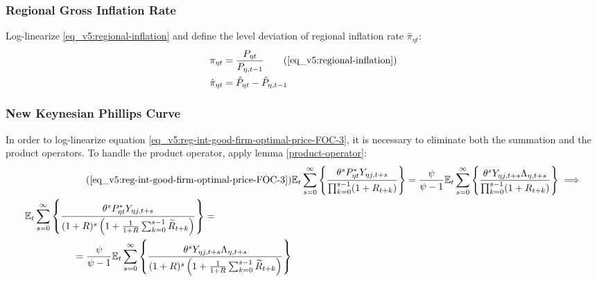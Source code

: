 \documentclass[../thesis.tex]{subfiles}
\begin{document}
		
	\subsubsection*{Regional Gross Inflation Rate}

	Log-linearize \ref{eq_v5:regional-inflation} and define the level deviation of regional inflation rate $\hat{\pi}_{\eta t}$:
	\begin{align}
		\pi_{\eta t} &= \frac{P_{\eta t}}{P_{\eta, t-1}} \tag{\ref{eq_v5:regional-inflation}} \\
		\hat{\pi}_{\eta t} &= \hat{P}_{\eta t} - \hat{P}_{\eta, t-1}
		\label{eq_v5:level-dev-regional-inflation}
	\end{align}


\subsubsection*{New Keynesian Phillips Curve}

In order to log-linearize equation \ref{eq_v5:reg-int-good-firm-optimal-price-FOC-3}, it is necessary to eliminate both the summation and the product operators. To handle the product operator, apply lemma \ref{product-operator}:
\begin{align}
	\tag{\ref{eq_v5:reg-int-good-firm-optimal-price-FOC-3}}
	& \E \sum_{s=0}^{\infty} \left\{ \frac{\theta^s P_{\eta t}^{\ast} Y_{\eta j,t+s}}{ \prod_{k=0}^{s-1}(1+R_{t+k})} \right\} = \frac{\psi}{\psi-1} \E \sum_{s=0}^{\infty} \left\{ \frac{\theta^s Y_{\eta j,t+s} \Lambda_{\eta, t+s}}{\prod_{k=0}^{s-1}(1+R_{t+k})} \right\} \implies
	\\
	\begin{split}
		& \E \sum_{s=0}^{\infty} \left\{ \frac{\theta^s P_{\eta t}^{\ast} Y_{\eta j,t+s}}{ (1 + R)^s \left( 1 + \frac{1}{1 + R} \sum_{k=0}^{s-1} \widetilde{R}_{t+k} \right)} \right\} = 
		\\ & \quad \quad \quad \quad \quad = \frac{\psi}{\psi-1} \E \sum_{s=0}^{\infty} \left\{ \frac{\theta^s Y_{\eta j,t+s} \Lambda_{\eta, t+s}}{ (1 + R)^s \left( 1 + \frac{1}{1 + R} \sum_{k=0}^{s-1} \widetilde{R}_{t+k} \right)} \right\} \label{eq_v5:reg-ll-optimal-price}
	\end{split}
\end{align}
\end{document}
